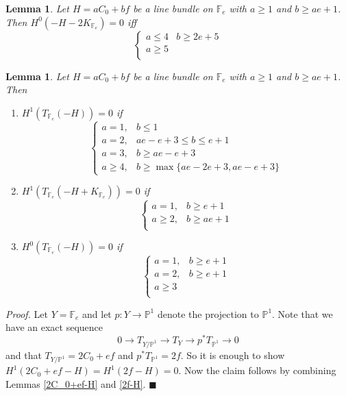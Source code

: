 \documentclass[11pt,twoside]{amsart}
\theoremstyle{plain}
\numberwithin{equation}{section}
\newtheorem{lemma}[theorem]{Lemma}
\theoremstyle{definition}
\newcommand*{\QEDA}{\hfill\ensuremath{\blacksquare}}
\begin{document}
\begin{lemma}\label{-H-2K_Y}
Let $H = aC_0+bf$ be a line bundle on $\mathbb{F}_e$ with $a \geq 1$ and $b \geq ae+1$. Then $H^0(-H-2K_{\mathbb{F}_e}) = 0$ iff 
\[
\begin{cases}
   a \leq 4 & b \geq 2e+5  \\
   a \geq 5 &   \\
   
\end{cases}
\]
    
\end{lemma}

\begin{lemma}\label{T_Y(-H)}
Let $H = aC_0+bf$ be a line bundle on $\mathbb{F}_e$ with $a \geq 1$ and $b \geq ae+1$. Then 
\begin{enumerate}
    \item[(1)] $H^1(T_{\mathbb{F}_e}(-H)) = 0$ if 
\[
\begin{cases}
   a = 1, & b \leq 1  \\
   a = 2, & ae-e+3 \leq b \leq e+1  \\
   a = 3, & b \geq ae-e+3 \\
   a \geq 4, & b \geq \operatorname{max}\{ae-2e+3, ae-e+3\}
   
\end{cases}
\]

  \item[(2)] $H^1(T_{\mathbb{F}_e}(-H+K_{\mathbb{F}_e})) = 0$ if 
\[
\begin{cases}
   a = 1, & b \geq e+1  \\
   a \geq 2, & b \geq ae+1 \\
\end{cases}
\] 

\item[(3)] $H^0(T_{\mathbb{F}_e}(-H)) = 0$ if 
\[
\begin{cases}
   a = 1, & b \geq e+1  \\
   a = 2, & b \geq e+1 \\
   a \geq 3 & \\
\end{cases}
\] 

\end{enumerate}

\end{lemma}

\noindent\textit{Proof.} Let $Y = \mathbb{F}_e$ and let $p: Y \to \mathbb{P}^1$ denote the projection to $\mathbb{P}^1$. Note that we have an exact sequence 
$$0 \to T_{Y/\mathbb{P}^1} \to T_Y \to p^*T_{\mathbb{P}^1} \to 0$$
and that $T_{Y/\mathbb{P}^1} = 2C_0+ef$ and $p^*T_{\mathbb{P}^1} = 2f$. So it is enough to show $H^1(2C_0+ef-H) = H^1(2f-H) = 0$. Now the claim follows by combining Lemmas \ref{2C_0+ef-H} and \ref{2f-H}. \QEDA
\end{document}

